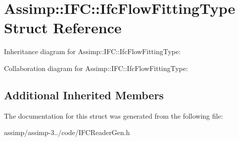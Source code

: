 \hypertarget{struct_assimp_1_1_i_f_c_1_1_ifc_flow_fitting_type}{\section{Assimp\+:\+:I\+F\+C\+:\+:Ifc\+Flow\+Fitting\+Type Struct Reference}
\label{struct_assimp_1_1_i_f_c_1_1_ifc_flow_fitting_type}
}


Inheritance diagram for Assimp\+:\+:I\+F\+C\+:\+:Ifc\+Flow\+Fitting\+Type\+:


Collaboration diagram for Assimp\+:\+:I\+F\+C\+:\+:Ifc\+Flow\+Fitting\+Type\+:
\subsection*{Additional Inherited Members}


The documentation for this struct was generated from the following file\+:\begin{DoxyCompactItemize}
\item 
assimp/assimp-\/3../code/I\+F\+C\+Reader\+Gen.\+h\end{DoxyCompactItemize}
